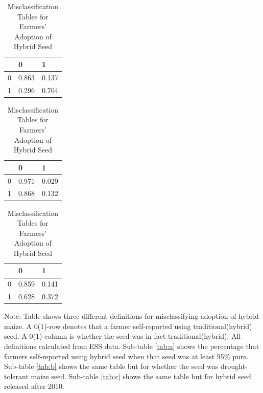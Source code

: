 \documentclass[11pt]{article}
\begin{document}
\begin{table}[]
    \begin{subtable}{.5\linewidth}
      \centering
        \caption{Hybrid DNA Purity $>$ 95\% \label{tab:a}}
        \begin{tabular}{lll}
        \toprule
         & 0 & 1 \\
        \midrule
        0 & 0.863 & 0.137 \\
        1 & 0.296 & 0.704 \\
        \bottomrule
        \end{tabular}
        \vspace{1cm}
    \end{subtable}%
    \begin{subtable}{.5\linewidth}
      \centering
        \caption{DNA Fingerprinting for Drought-Tolerant Maize \label{tab:b}}
        \begin{tabular}{lll}
        \toprule
         & 0 & 1 \\
        \midrule
        0 & 0.971 & 0.029 \\
        1 & 0.868 & 0.132 \\
        \bottomrule
        \end{tabular}
        \vspace{1cm}
    \end{subtable} 
    \begin{subtable}{\linewidth}
        \centering
        \caption{DNA Fingerprinting of Seed Released after 2010 \label{tab:c}}
        \begin{tabular}{lll}
        \toprule
         & 0 & 1 \\
        \midrule
        0 & 0.859 & 0.141 \\
        1 & 0.628 & 0.372 \\
        \bottomrule
        \end{tabular}
    \end{subtable}
    \caption{Misclassification Tables for Farmers' Adoption of Hybrid Seed \label{tab:misclassification}}
    \begin{tablenotes}
    \footnotesize
    \item{Note: Table shows three different definitions for misclassifying adoption of hybrid maize. A 0(1)-row denotes that a farmer self-reported using traditional(hybrid) seed. A 0(1)-column is whether the seed was in fact traditional(hybrid). All definitions calculated from ESS data. Sub-table \ref{tab:a} shows the percentage that farmers self-reported using hybrid seed when that seed was at least 95\% pure. Sub-table \ref{tab:b} shows the same table but for whether the seed was drought-tolerant maize seed. Sub-table \ref{tab:c} shows the same table but for hybrid seed released after 2010.}
    \end{tablenotes}
\end{table}
\end{document}
